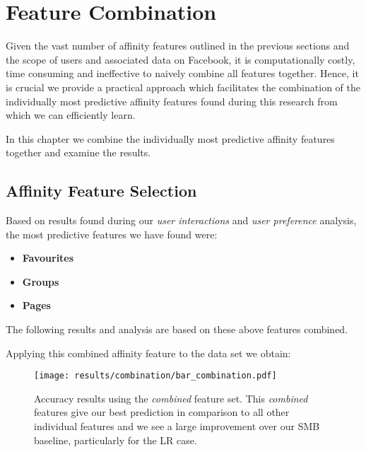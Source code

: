 
\chapter{Feature Combination}
\label{cha:bma}

Given the vast number of affinity features outlined in the previous sections and the scope of users and associated data on Facebook, it is computationally costly, time 
consuming and ineffective to naively combine all features together. Hence, it is crucial we provide a practical approach which 
facilitates the combination of the individually most predictive affinity features found during this research from which we can efficiently learn.

In this chapter we combine the individually most predictive affinity features together and examine the results.

\section{Affinity Feature Selection}
\label{sec:notation}

Based on results found during our \emph{user interactions} and \emph{user preference} analysis, the most predictive features we have found were:
\begin{itemize}
\item \textbf{Favourites}
\item \textbf{Groups}
\item \textbf{Pages}
\end{itemize}

The following results and analysis are based on these above features combined.

\clearpage

Applying this combined affinity feature to the data set we obtain:

\begin{figure}[h]
	\begin{center}
		\texttt{[image: results/combination/bar\_combination.pdf]}
		\caption{Accuracy results using the \emph{combined} feature set. This \emph{combined} features give our best prediction 
		in comparison to all other individual features and we see a large improvement over our SMB baseline, particularly for the LR case.}
	\end{center}
\end{figure}

\clearpage

